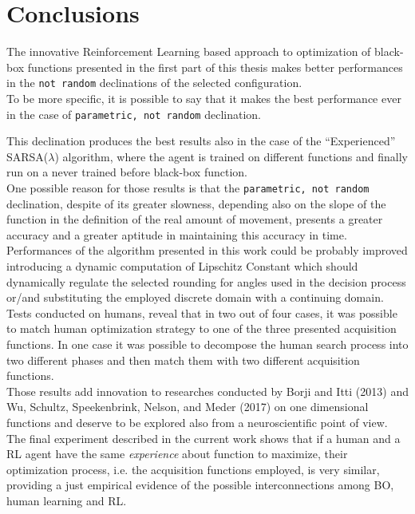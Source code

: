 \chapter{Conclusions}

The innovative Reinforcement Learning based approach to optimization of black-box functions presented in the first part of this thesis makes better performances in the {\tt not random} declinations of the selected configuration. \\

To be more specific, it is possible to say that it makes the best performance ever in the case of {\tt parametric, not random} declination.

This declination produces the best results also in the case of the \enquote{Experienced} SARSA($\lambda$) algorithm, where the agent is trained on different functions and finally run on a never trained before black-box function. \\

One possible reason for those results is that the {\tt parametric, not random} declination, despite of its greater slowness, depending also on the slope of the function in the definition of the real amount of movement, presents a greater accuracy and a greater aptitude in maintaining this accuracy in time. \\

Performances of the algorithm presented in this work could be probably improved introducing a dynamic computation of Lipschitz Constant which should dynamically regulate the selected rounding for angles used in the decision process or/and substituting the employed discrete domain with a continuing domain. \\

Tests conducted on humans, reveal that in two out of four cases, it was possible to match human optimization strategy to one of the three presented acquisition functions. In one case it was possible to decompose the human search process into two different phases and then match them with two different acquisition functions. \\

Those results add innovation to researches conducted by Borji and Itti (2013) and Wu, Schultz, Speekenbrink, Nelson, and Meder (2017) on one dimensional functions and deserve to be explored also from a neuroscientific point of view. \\

The final experiment described in the current work shows that if a human and a RL agent have the same \textit{experience} about function to maximize, their optimization process, i.e. the acquisition functions employed, is very similar, providing a just empirical evidence of the possible interconnections among BO, human learning and RL.




